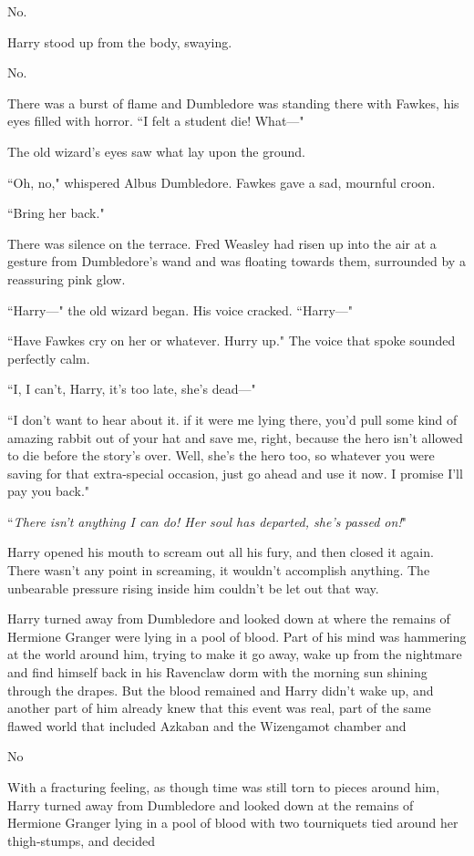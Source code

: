 No.

Harry stood up from the body, swaying.

No.

There was a burst of flame and Dumbledore was standing there with Fawkes, his eyes filled with horror. ``I felt a student die! What—"

The old wizard's eyes saw what lay upon the ground.

``Oh, no," whispered Albus Dumbledore. Fawkes gave a sad, mournful croon.

``Bring her back."

There was silence on the terrace. Fred Weasley had risen up into the air at a gesture from Dumbledore's wand and was floating towards them, surrounded by a reassuring pink glow.

``Harry—" the old wizard began. His voice cracked. ``Harry—"

``Have Fawkes cry on her or whatever. Hurry up." The voice that spoke sounded perfectly calm.

``I, I can't, Harry, it's too late, she's dead—"

``I don't want to hear about it. if it were me lying there, you'd pull some kind of amazing rabbit out of your hat and save me, right, because the hero isn't allowed to die before the story's over. Well, she's the hero too, so whatever you were saving for that extra-special occasion, just go ahead and use it now. I promise I'll pay you back."

``\emph{There isn't anything I can do! Her soul has departed, she's passed on!}"

Harry opened his mouth to scream out all his fury, and then closed it again. There wasn't any point in screaming, it wouldn't accomplish anything. The unbearable pressure rising inside him couldn't be let out that way.

Harry turned away from Dumbledore and looked down at where the remains of Hermione Granger were lying in a pool of blood. Part of his mind was hammering at the world around him, trying to make it go away, wake up from the nightmare and find himself back in his Ravenclaw dorm with the morning sun shining through the drapes. But the blood remained and Harry didn't wake up, and another part of him already knew that this event was real, part of the same flawed world that included Azkaban and the Wizengamot chamber and

No

With a fracturing feeling, as though time was still torn to pieces around him, Harry turned away from Dumbledore and looked down at the remains of Hermione Granger lying in a pool of blood with two tourniquets tied around her thigh-stumps, and decided

